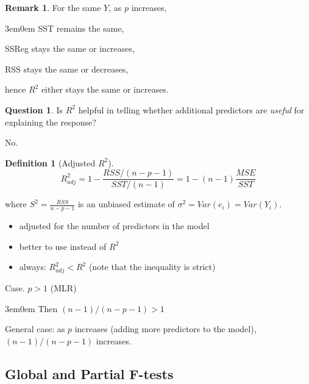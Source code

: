 \documentclass[11pt]{article}
\newenvironment{indentone}{\begin{adjustwidth}{3em}{0em}}{\end{adjustwidth}}
\theoremstyle{definition}
\newtheorem{definition}{Definition}[section]
\newtheorem{remark}{Remark}[section]
\newtheorem{question}{Question}[section]
\numberwithin{equation}{section}
\begin{document}
\begin{remark}
For the same $Y$, as $p$ increases, 

\begin{indentone}
  SST remains the same,

  SSReg stays the same or increases,

  RSS stays the same or decreases, 
\end{indentone}

hence $R^2$ either stays the same or increases.
\end{remark}

\begin{question}
  Is $R^2$ helpful in telling whether additional predictors are \textit{useful} for explaining the response?

  No.
\end{question}

\begin{definition}[Adjusted $R^2$]
  \begin{equation}
    R^2_{adj} = 1- \frac{RSS/(n-p-1)}{SST/(n-1)} = 1 - (n-1)\frac{MSE}{SST}
  \end{equation}

  where $S^2=\frac{RSS}{n-p-1}$ is an unbiased estimate of $\sigma^2=Var(e_i)=Var(Y_i)$.
  \begin{itemize}
    \item adjusted for the number of predictors in the model
    \item better to use instead of $R^2$
    \item always: $R^2_{adj} < R^2$ (note that the inequality is strict) 
  \end{itemize}
\end{definition}
\begin{writenotes}
  Case. $p > 1$ (MLR)
  \begin{indentone}
    Then $(n-1)/(n-p-1) > 1$
  \end{indentone}
  General case: as $p$ increases (adding more predictors to the model), $(n-1)/(n-p-1)$ increases.
\end{writenotes}

\subsection{Global and Partial F-tests}
\end{document}
